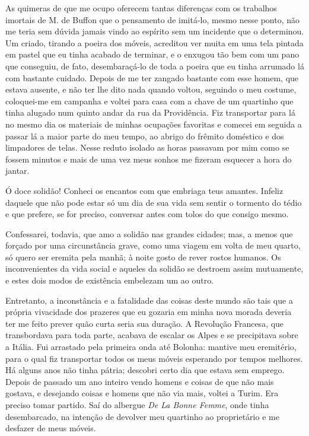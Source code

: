 As quimeras de que me ocupo oferecem tantas diferenças com os trabalhos
imortais de M. de Buffon que o pensamento de imitá-lo, mesmo nesse
ponto, não me teria sem dúvida jamais vindo ao espírito sem um
incidente que o determinou. Um criado, tirando a poeira dos móveis,
acreditou ver muita em uma tela pintada em pastel que eu tinha acabado
de terminar, e o enxugou tão bem com um pano que conseguiu, de fato,
desembaraçá-lo de toda a poeira que eu tinha arrumado lá com bastante
cuidado. Depois de me ter zangado bastante com esse homem, que estava
ausente, e não ter lhe dito nada quando voltou, seguindo o meu costume,
coloquei-me em campanha e voltei para casa com a chave de um quartinho
que tinha alugado num quinto andar da rua da Providência. Fiz
transportar para lá no mesmo dia os materiais de minhas ocupações
favoritas e comecei em seguida a passar lá a maior parte do meu tempo,
ao abrigo do frêmito doméstico e dos limpadores de telas. Nesse reduto
isolado as horas passavam por mim como se fossem minutos e mais de uma
vez meus sonhos me fizeram esquecer a hora do jantar. 

Ó doce solidão! Conheci os encantos com que embriaga teus amantes.
Infeliz daquele que não pode estar só um dia de sua vida sem sentir o
tormento do tédio e que prefere, se for preciso, conversar antes com
tolos do que consigo mesmo.

Confessarei, todavia, que amo a solidão nas grandes cidades; mas, a
menos que forçado por uma circunstância grave, como uma viagem em volta
de meu quarto, só quero ser eremita pela manhã; à noite gosto de rever
rostos humanos. Os inconvenientes da vida social e aqueles da solidão
se destroem assim mutuamente, e estes dois modos de existência
embelezam um ao outro.

Entretanto, a inconstância e a fatalidade das coisas deste mundo são
tais que a própria vivacidade dos prazeres que eu gozaria em minha nova
morada deveria ter me feito prever quão curta seria sua duração. A
Revolução Francesa, que transbordava para toda parte, acabava de
escalar os Alpes e se precipitava sobre a Itália. Fui arrastado pela
primeira onda até Bolonha: mantive meu eremitério, para o qual fiz
transportar todos os meus móveis esperando por tempos melhores. Há alguns
anos não tinha pátria; descobri certo dia que estava sem emprego.
Depois de passado um ano inteiro vendo homens e coisas de que não mais
gostava, e desejando coisas e homens que não via mais, voltei a Turim.
Era preciso tomar partido. Saí do albergue  \textit{De La Bonne Femme},
onde tinha desembarcado, na intenção de devolver meu quartinho ao
proprietário e me desfazer de meus móveis.

